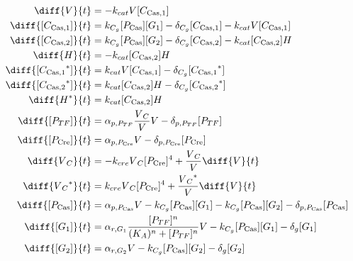 \begin{align}
\diff{\vectorGen{}}{t} & = - \casCutRate{{}}\vectorGen{}\conc{\cplx{\cas}{1}}\\
\diff{\conc{\cplx{\cas}{1}}}{t} & =  \gRnaBind{}\conc{\proSp{\cas{}}}\conc{\gRna{1}} - \casCompDegradeRate{}\conc{\cplx{\cas}{1}} - \casCutRate{{}}\vectorGen{}\conc{\cplx{\cas}{1}}\\
\diff{\conc{\cplx{\cas}{2}}}{t} & =  \gRnaBind{}\conc{\proSp{\cas{}}}\conc{\gRna{2}} - \casCompDegradeRate{}\conc{\cplx{\cas}{2}} - \casCutRate{{}}\conc{\cplx{\cas}{2}}\hostGen{}\\
\diff{\hostGen{}}{t} & = - \casCutRate{{}}\conc{\cplx{\cas}{2}}\hostGen{}\\
\diff{\conc{\bound{\cplx{\cas}{1}}}}{t} & =  \casCutRate{{}}\vectorGen{}\conc{\cplx{\cas}{1}} - \casCompDegradeRate{}\conc{\bound{\cplx{\cas}{1}}}\\
\diff{\conc{\bound{\cplx{\cas}{2}}}}{t} & =  \casCutRate{{}}\conc{\cplx{\cas}{2}}\hostGen{} - \casCompDegradeRate{}\conc{\bound{\cplx{\cas}{2}}}\\
\diff{\edited{\hostGen{}}}{t} & =  \casCutRate{{}}\conc{\cplx{\cas}{2}}\hostGen{}\\
\diff{\conc{\proSp{TF}}}{t} & =  \txtlRate{\proSp{TF}}\frac{\vectorGen{}_C}{\vectorGen{}}\vectorGen{} - \proDegradeRate{\proSp{TF}}\conc{\proSp{TF}}\\
\diff{\conc{\proSp{\cre{}}}}{t} & =  \txtlRate{\proSp{\cre{}}}\vectorGen{} - \proDegradeRate{\proSp{\cre{}}}\conc{\proSp{\cre{}}}\\
\diff{\vectorGen{}_C}{t} & = - \creCutRate{} \vectorGen{}_C \conc{\proSp{\cre{}}}^4 + \frac{\vectorGen{}_C}{\vectorGen{}} \diff{\vectorGen{}}{t}\\
\diff{\edited{\vectorGen{}_C}}{t} & =  \creCutRate{} \vectorGen{}_C \conc{\proSp{\cre{}}}^4 + \frac{\edited{\vectorGen{}_C}}{\vectorGen{}} \diff{\vectorGen{}}{t}\\
\diff{\conc{\proSp{\cas{}}}}{t} & =  \txtlRate{\proSp{\cas{}}}\vectorGen{} - \gRnaBind{}\conc{\proSp{\cas{}}}\conc{\gRna{1}} - \gRnaBind{}\conc{\proSp{\cas{}}}\conc{\gRna{2}} - \proDegradeRate{\proSp{\cas{}}}\conc{\proSp{\cas{}}}\\
\diff{\conc{\gRna{1}}}{t} & =  \txRate{\gRna{1}}\frac{\conc{\proSp{TF}}^n}{(K_A)^n + \conc{\proSp{TF}}^n}\vectorGen{} - \gRnaBind{}\conc{\proSp{\cas{}}}\conc{\gRna{1}} - \rnaDegradeRate{}\conc{\gRna{1}}\\
\diff{\conc{\gRna{2}}}{t} & =  \txRate{\gRna{2}}\vectorGen{} - \gRnaBind{}\conc{\proSp{\cas{}}}\conc{\gRna{2}} - \rnaDegradeRate{}\conc{\gRna{2}}
\end{align}


